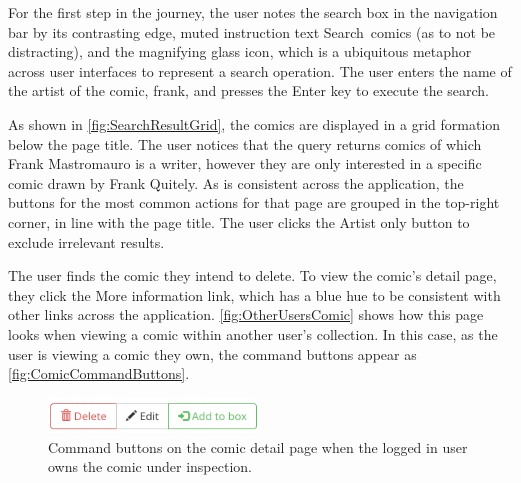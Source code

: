 \documentclass[fontsize=12pt,a4paper]{scrreprt}
\begin{document}
For the first step in the journey, the user notes the search box in the navigation bar by its contrasting edge, muted instruction text \textsf{Search~comics} (as to not be distracting), and the magnifying glass icon, which is a ubiquitous metaphor across user interfaces to represent a search operation. The user enters the name of the artist of the comic, \textsf{frank}, and presses the \textsf{Enter} key to execute the search.

As shown in \autoref{fig:SearchResultGrid}, the comics are displayed in a grid formation below the page title. The user notices that the query returns comics of which \textsf{Frank Mastromauro} is a writer, however they are only interested in a specific comic drawn by \textsf{Frank Quitely}. As is consistent across the application, the buttons for the most common actions for that page are grouped in the top-right corner, in line with the page title. The user clicks the \textsf{Artist only} button to exclude irrelevant results.

The user finds the comic they intend to delete. To view the comic's detail page, they click the \textsf{More information} link, which has a blue hue to be consistent with other links across the application. \autoref{fig:OtherUsersComic} shows how this page looks when viewing a comic within another user's collection. In this case, as the user is viewing a comic they own, the command buttons appear as \autoref{fig:ComicCommandButtons}.

\begin{figure}[b]
  \centering
  \includegraphics[width=0.5\textwidth]{comic_command_buttons.png}
  \caption{
    Command buttons on the comic detail page when the logged in user owns the comic under inspection.
  }
  \label{fig:ComicCommandButtons}
\end{figure}
\end{document}
